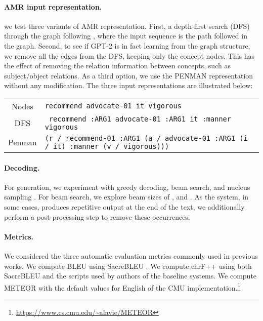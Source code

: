 \documentclass[11pt,a4paper]{article}
\begin{document}
\paragraph{AMR input representation.} we test three variants of AMR representation. First, a depth-first search (DFS) through the graph following , where the input sequence is the path followed in the graph. Second, to see if GPT-2 is in fact learning from the graph structure, we remove all the edges from the DFS, keeping only the concept nodes. This has the effect of removing the relation information between concepts, such as subject/object relations. As a third option, we use the PENMAN representation without any modification. The three input representations are illustrated below:

\vspace{1mm}
\begin{tabular}{c p{5.5cm}}
\small Nodes   & \small \texttt{recommend advocate-01 it vigorous}\\
\small DFS     & \small \texttt{ recommend :ARG1 advocate-01 :ARG1 it :manner vigorous} \\
\small Penman     & \small \texttt{(r / recommend-01
  :ARG1 (a / advocate-01
          :ARG1 (i / it)
          :manner (v / vigorous)))}
\end{tabular}
\vspace{1mm}

\paragraph{Decoding.} 
For generation, we experiment with greedy decoding, beam search, and nucleus sampling \cite{holtzman2019curious}. For beam search, we explore beam sizes of ,  and . As the system, in some cases, produces repetitive output at the end of the text, we additionally perform a post-processing step to remove these occurrences. 

\paragraph{Metrics.} We considered the three automatic evaluation metrics commonly used in previous works. We compute BLEU \cite{papineni2002bleu} using  SacreBLEU \cite{ma2019results}. We compute chrF++ \cite{popovic2017chrf++} using both SacreBLEU and the scripts used by authors of the baseline systems. We compute METEOR \cite{banerjee2005meteor} with the default values for English of the CMU implementation.\footnote{\url{https://www.cs.cmu.edu/~alavie/METEOR}}
\end{document}
